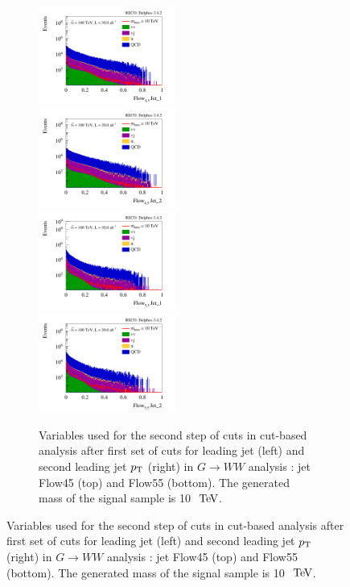 \documentclass{cernrep}
\begin{document}
\begin{figure}[!htb]
\begin{figure}[!htb]\centering
\includegraphics[width=0.495\textwidth]{Fig/RSGww/cut/Jet1_Flow45_sel1_nostack_log.png}
\includegraphics[width=0.495\textwidth]{Fig/RSGww/cut/Jet2_Flow45_sel1_nostack_log.png}
\includegraphics[width=0.495\textwidth]{Fig/RSGww/cut/Jet1_Flow55_sel1_nostack_log.png}
\includegraphics[width=0.495\textwidth]{Fig/RSGww/cut/Jet2_Flow55_sel1_nostack_log.png}
\caption{Variables used for the second step of cuts in cut-based analysis after first set of cuts for leading jet (left) and second leading jet $p\sb{\scriptstyle\mathrm{T}}$ (right) in $G \rightarrow WW$ analysis : jet Flow45 (top) and Flow55 (bottom). The generated mass of the signal sample is 10 $\TeV$.}
\label{fig:RSGww_sel1_cut}
\end{figure}


\end{figure}
\end{document}
